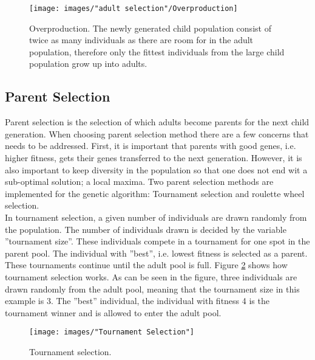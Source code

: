 \begin{figure}[h!]
\begin{center}
\texttt{[image: images/"adult selection"/Overproduction]}
\caption{Overproduction. The newly generated child population consist of twice as many individuals as there are room for in the adult population, therefore only the fittest individuals from the large child population grow up into adults.}
\label{figure:overproduction}
\end{center}
\end{figure}



\subsection{Parent Selection}\label{subsection:parent selection}
Parent selection is the selection of which adults become parents for the next child generation. When choosing parent selection method there are a few concerns that needs to be addressed. First, it is important that parents with good genes, i.e. higher fitness, gets their genes transferred to the next generation. However, it is also important to keep diversity in the population so that one does not end wit a sub-optimal solution; a local maxima. Two parent selection methods are implemented for the genetic algorithm: Tournament selection and roulette wheel selection. \\

\noindent In tournament selection, a given number of individuals are drawn randomly from the population. The number of individuals drawn is decided by the variable ''tournament size''. These individuals compete in a tournament for one spot in the parent pool. The individual with ''best'', i.e. lowest fitness is selected as a parent. These tournaments continue until the adult pool is full. Figure \ref{figure:tournament selection} shows how tournament selection works. As can be seen in the figure, three individuals are drawn randomly from the adult pool, meaning that the tournament size in this example is 3. The ''best'' individual, the individual with fitness 4 is the tournament winner and is allowed to enter the adult pool. \\


\begin{figure}[h!]
\begin{center}
\texttt{[image: images/"Tournament Selection"]}
\caption{Tournament selection.}
\label{figure:tournament selection}
\end{center}
\end{figure}


